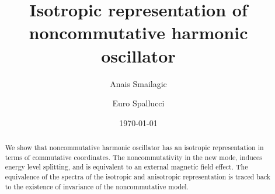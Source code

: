 \documentclass[a4paper,aps,prd,preprint]{revtex4}
\begin{document}
\title{Isotropic representation of noncommutative \coordHE{} harmonic 
oscillator}

\author{Anais Smailagic}
\author{Euro Spallucci}
\date{\today}


\begin{abstract}
We show that  \coordHE{} noncommutative harmonic oscillator has an isotropic
representation in terms of commutative coordinates.
The noncommutativity in the new mode, induces energy level 
splitting, and is equivalent to an external magnetic field effect. The
equivalence of the spectra of the isotropic and anisotropic representation
is traced back to the existence of  \coordHE{} invariance of the noncommutative
model.
\end{abstract}

\maketitle
\end{document}
